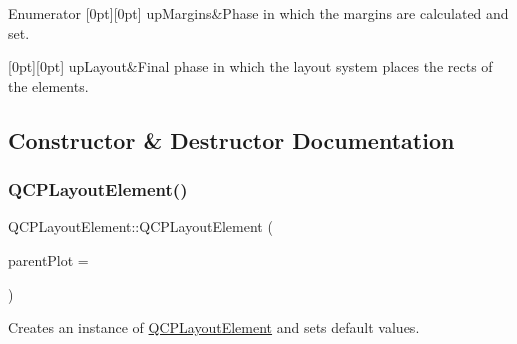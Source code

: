 \begin{DoxyEnumFields}{Enumerator}
[0pt][0pt]{}\mbox{\label{class_q_c_p_layout_element_a0d83360e05735735aaf6d7983c56374dae1924e6bd8696f20d2eb224d8084a268}} 
up\+Margins&Phase in which the margins are calculated and set. \\
\hline

[0pt][0pt]{}\mbox{\label{class_q_c_p_layout_element_a0d83360e05735735aaf6d7983c56374da9bf485ceb1c27efc5cbea2bb07ff0c4d}} 
up\+Layout&Final phase in which the layout system places the rects of the elements. \\
\hline

\end{DoxyEnumFields}


\subsection{Constructor \& Destructor Documentation}
\mbox{\label{class_q_c_p_layout_element_a8947f0ada17e672aaba3d424cbbb67e3}} 
\subsubsection{\texorpdfstring{Q\+C\+P\+Layout\+Element()}{QCPLayoutElement()}}
{\footnotesize\ttfamily Q\+C\+P\+Layout\+Element\+::\+Q\+C\+P\+Layout\+Element (\begin{DoxyParamCaption}\item[{\hyperlink{class_q_custom_plot}{Q\+Custom\+Plot} $\ast$}]{parent\+Plot = {} }\end{DoxyParamCaption})\hspace{0.3cm}{\ttfamily [explicit]}}

Creates an instance of \hyperlink{class_q_c_p_layout_element}{Q\+C\+P\+Layout\+Element} and sets default values. 

